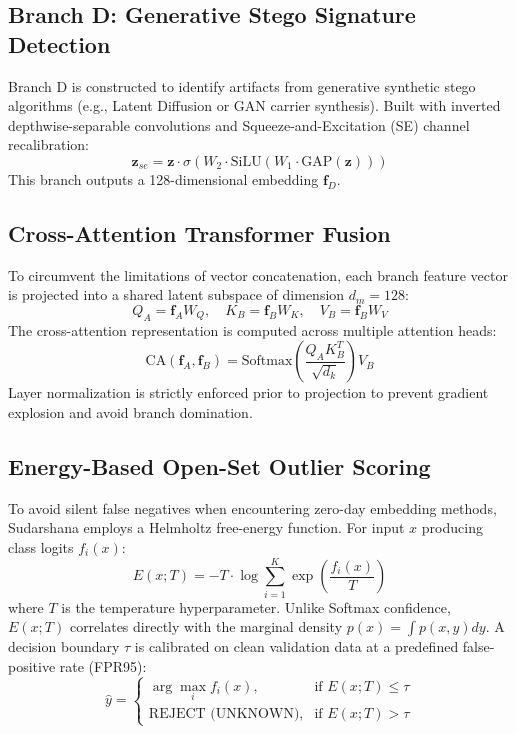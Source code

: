 \documentclass[journal]{IEEEtran}
\begin{document}
\subsection{Branch D: Generative Stego Signature Detection}
Branch D is constructed to identify artifacts from generative synthetic stego algorithms (e.g., Latent Diffusion or GAN carrier synthesis). Built with inverted depthwise-separable convolutions and Squeeze-and-Excitation (SE) channel recalibration:
\begin{equation}
    \mathbf{z}_{se} = \mathbf{z} \cdot \sigma\left( W_2 \cdot \text{SiLU}(W_1 \cdot \text{GAP}(\mathbf{z})) \right)
\end{equation}
This branch outputs a 128-dimensional embedding $\mathbf{f}_D$.

\subsection{Cross-Attention Transformer Fusion}
To circumvent the limitations of vector concatenation, each branch feature vector is projected into a shared latent subspace of dimension $d_m = 128$:
\begin{equation}
    Q_A = \mathbf{f}_A W_Q, \quad K_B = \mathbf{f}_B W_K, \quad V_B = \mathbf{f}_B W_V
\end{equation}
The cross-attention representation is computed across multiple attention heads:
\begin{equation}
    \text{CA}(\mathbf{f}_A, \mathbf{f}_B) = \text{Softmax}\left( \frac{Q_A K_B^T}{\sqrt{d_k}} \right) V_B
\end{equation}
Layer normalization is strictly enforced prior to projection to prevent gradient explosion and avoid branch domination.

\subsection{Energy-Based Open-Set Outlier Scoring}
To avoid silent false negatives when encountering zero-day embedding methods, Sudarshana employs a Helmholtz free-energy function. For input $x$ producing class logits $f_i(x)$:
\begin{equation}
    E(x; T) = -T \cdot \log \sum_{i=1}^{K} \exp\left( \frac{f_i(x)}{T} \right)
\end{equation}
where $T$ is the temperature hyperparameter. Unlike Softmax confidence, $E(x; T)$ correlates directly with the marginal density $p(x) = \int p(x, y) dy$. A decision boundary $\tau$ is calibrated on clean validation data at a predefined false-positive rate (FPR95):
\begin{equation}
    \hat{y} = \begin{cases}
    \arg\max_i f_i(x), & \text{if } E(x; T) \le \tau \\
    \text{REJECT (UNKNOWN)}, & \text{if } E(x; T) > \tau
    \end{cases}
\end{equation}
\end{document}
